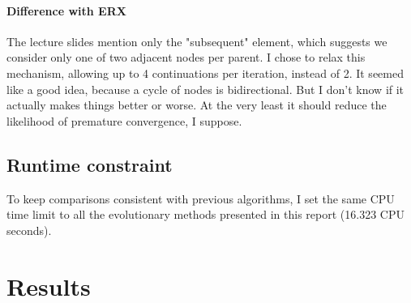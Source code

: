 \documentclass[14pt]{article}
\begin{document}
\paragraph{Difference with ERX} The lecture slides mention only the
"subsequent" element, which suggests we consider only one of two adjacent nodes
per parent. I chose to relax this mechanism, allowing up to 4 continuations per
iteration, instead of 2. It seemed like a good idea, because a cycle of nodes
is bidirectional. But I don't know if it actually makes things better or worse.
At the very least it should reduce the likelihood of premature convergence, I
suppose.

\subsection{Runtime constraint}

To keep comparisons consistent with previous algorithms, I set the same CPU
time limit to all the evolutionary methods presented in this report (16.323 CPU
seconds).

\section{Results}
\end{document}
